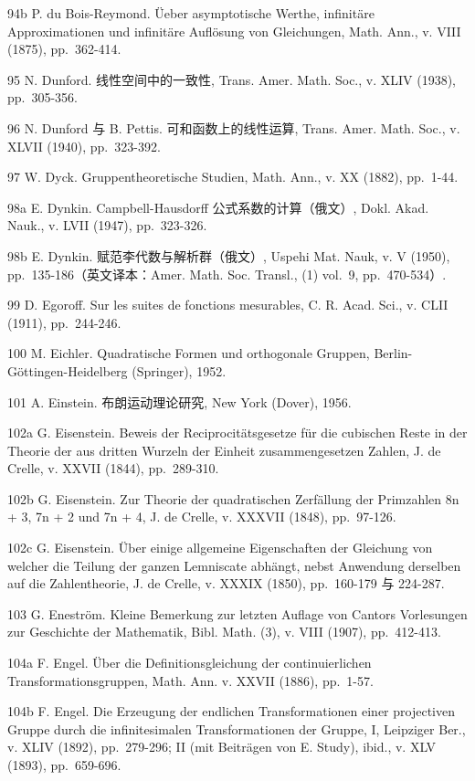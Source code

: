 94b P. du Bois-Reymond. Üeber asymptotische Werthe, infinitäre Approximationen und infinitäre Auflösung von Gleichungen, Math. Ann., v. VIII (1875), pp.~362-414.

95 N. Dunford. 线性空间中的一致性, Trans. Amer. Math. Soc., v. XLIV (1938), pp.~305-356.

96 N. Dunford 与 B. Pettis. 可和函数上的线性运算, Trans. Amer. Math. Soc., v. XLVII (1940), pp.~323-392.

97 W. Dyck. Gruppentheoretische Studien, Math. Ann., v. XX (1882), pp.~1-44.

98a E. Dynkin. Campbell-Hausdorff 公式系数的计算（俄文）, Dokl. Akad. Nauk., v. LVII (1947), pp.~323-326.

98b E. Dynkin. 赋范李代数与解析群（俄文）, Uspehi Mat. Nauk, v. V (1950), pp.~135-186（英文译本：Amer. Math. Soc. Transl., (1) vol.~9, pp.~470-534）.

99 D. Egoroff. Sur les suites de fonctions mesurables, C. R. Acad. Sci., v. CLII (1911), pp.~244-246.

100 M. Eichler. Quadratische Formen und orthogonale Gruppen, Berlin-Göttingen-Heidelberg (Springer), 1952.

101 A. Einstein. 布朗运动理论研究, New York (Dover), 1956.

102a G. Eisenstein. Beweis der Reciprocitätsgesetze für die cubischen Reste in der Theorie der aus dritten Wurzeln der Einheit zusammengesetzen Zahlen, J. de Crelle, v. XXVII (1844), pp.~289-310.

102b G. Eisenstein. Zur Theorie der quadratischen Zerfällung der Primzahlen 8n + 3, 7n + 2 und 7n + 4, J. de Crelle, v. XXXVII (1848), pp.~97-126.

102c G. Eisenstein. Über einige allgemeine Eigenschaften der Gleichung von welcher die Teilung der ganzen Lemniscate abhängt, nebst Anwendung derselben auf die Zahlentheorie, J. de Crelle, v. XXXIX (1850), pp.~160-179 与 224-287.

103 G. Eneström. Kleine Bemerkung zur letzten Auflage von Cantors Vorlesungen zur Geschichte der Mathematik, Bibl. Math. (3), v. VIII (1907), pp.~412-413.

104a F. Engel. Über die Definitionsgleichung der continuierlichen Transformationsgruppen, Math. Ann. v. XXVII (1886), pp.~1-57.

104b F. Engel. Die Erzeugung der endlichen Transformationen einer projectiven Gruppe durch die infinitesimalen Transformationen der Gruppe, I, Leipziger Ber., v. XLIV (1892), pp.~279-296; II (mit Beiträgen von E. Study), ibid., v. XLV (1893), pp.~659-696.

